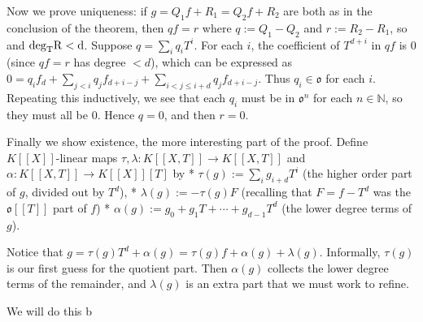 Now we prove uniqueness: if $g=Q_1f+R_1=Q_2f+R_2$ are both as in the conclusion of the theorem, then $qf=r$ where $q:=Q_1-Q_2$ and $r:=R_2-R_1$, so and $\rm{deg}_TR<d$. Suppose $q=\sum_i q_i T^i$. For each $i$, the coefficient of $T^{d+i}$ in $qf$ is 0 (since $qf=r$ has degree $<d$), which can be expressed as $0=q_if_d+\sum_{j<i}q_jf_{d+i-j}+\sum_{i<j\le i+d}q_jf_{d+i-j}$. Thus $q_i\in \mathfrak{o}$ for each $i$. Repeating this inductively, we see that each $q_i$ must be in $\mathfrak{o}^n$ for each $n\in \mathbb{N}$, so they must all be $0$. Hence $q=0$, and then $r=0$.

Finally we show existence, the more interesting part of the proof. Define $K[[X]]$-linear maps $\tau,\lambda:K[[X,T]]\rightarrow K[[X,T]]$ and $\alpha:K[[X,T]]\rightarrow K[[X]][T]$ by 
* $\tau(g):=\sum_i g_{i+d} T^i$ (the higher order part of $g$, divided out by $T^d$),
* $\lambda(g):=-\tau(g)F$ (recalling that $F=f-T^d$ was the $\mathfrak{o}[[T]]$ part of $f$)
* $\alpha(g):=g_0+g_1T+\cdots+g_{d-1}T^d$ (the lower degree terms of $g$).

Notice that $g=\tau(g)T^d+\alpha(g)=\tau(g)f+\alpha(g)+\lambda(g)$. Informally, $\tau(g)$ is our first guess for the quotient part. Then $\alpha(g)$ collects the lower degree terms of the remainder, and $\lambda(g)$ is an extra part that we must work to refine. 

We will do this b